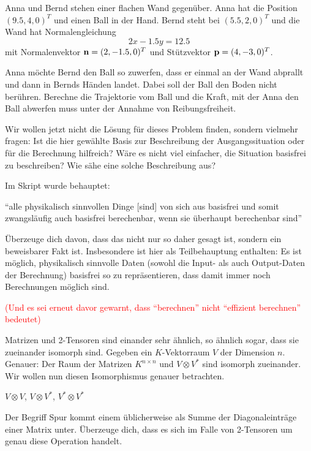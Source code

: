 \begin{sheet}
\begin{problem}[title={Vom Sinn und Unsinn der Basen}]
Anna und Bernd stehen einer flachen Wand gegenüber. Anna hat die Position $(9.5, 4,0)^T$ und  einen Ball in der Hand. Bernd steht bei $(5.5, 2, 0)^T$ und die Wand hat Normalengleichung \[2x-1.5y = 12.5\] mit Normalenvektor $\mathbf{n}=(2,-1.5,0)^T$ und Stützvektor $\mathbf{p}=(4,-3,0)^T$. 
        
Anna möchte Bernd den Ball so zuwerfen, dass er einmal an der Wand abprallt und dann in Bernds Händen landet. Dabei soll der Ball den Boden nicht berühren. Berechne die Trajektorie vom Ball und die Kraft, mit der Anna den Ball abwerfen muss unter der Annahme von Reibungsfreiheit.

\medbreak
Wir wollen jetzt nicht die Lösung für dieses Problem finden, sondern vielmehr fragen: Ist die hier gewählte Basis zur Beschreibung der Ausgangssituation oder für die Berechnung hilfreich? Wäre es nicht viel einfacher, die Situation basisfrei zu beschreiben? Wie sähe eine solche Beschreibung aus?
\end{problem}

\begin{problem}[title={Wilde Behauptungen}, difficulty={schwer}]
Im Skript wurde behauptet:

\enquote{alle physikalisch sinnvollen Dinge [sind] von sich aus basisfrei und somit zwangsläufig auch basisfrei berechenbar, wenn sie überhaupt berechenbar sind}

Überzeuge dich davon, dass das nicht nur so daher gesagt ist, sondern ein beweisbarer Fakt ist. Insbesondere ist hier als Teilbehauptung enthalten: Es ist möglich, physikalisch sinnvolle Daten (sowohl die Input- als auch Output-Daten der Berechnung) basisfrei so zu repräsentieren, dass damit immer noch Berechnungen möglich sind.

\medbreak
\textcolor{red}{(Und es sei erneut davor gewarnt, dass \enquote{berechnen} nicht \enquote{effizient berechnen} bedeutet)}
\end{problem}


\begin{problem}[title={Wiederholung von Isomorphie zwischen Vektorräumen: Matrix vs. 2-Tensor}]
	Matrizen und 2-Tensoren sind einander sehr ähnlich, so ähnlich sogar, dass sie zueinander isomorph sind. Gegeben ein $K$-Vektorraum $V$ der Dimension $n$. Genauer: Der Raum der Matrizen $K^{n\times n}$ und $V\otimes V^\ast$ sind isomorph zueinander. Wir wollen nun diesen Isomorphismus genauer betrachten.
	
$V\otimes V$, $V\otimes V^\ast$, $V^\ast \otimes V^\ast$
\end{problem}


\begin{problem}[title={Warum heißt das Spur?}]
	Der Begriff Spur kommt einem üblicherweise als Summe der Diagonaleinträge einer Matrix unter. Überzeuge dich, dass es sich im Falle von 2-Tensoren um genau diese Operation handelt.
\end{problem}

\end{sheet}